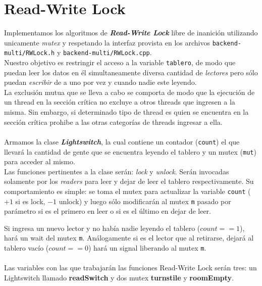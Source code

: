 \section{Read-Write Lock}

Implementamos los algoritmos de \emph{\textbf{Read-Write Lock}} libre de inanici\'on utilizando unicamente \textit{mutex} y respetando la interfaz provista en los archivos \texttt{backend-multi/RWLock.h} y \texttt{backend-multi/RWLock.cpp}.\\

Nuestro objetivo es restringir el acceso a la variable \texttt{tablero}, de modo que puedan leer los datos en \'el simultaneamente diversa cantidad de \emph{lectores} pero s\'olo puedan \emph{escribir} de a uno por vez y cuando nadie este leyendo.\\

La exclusi\'on mutua que se lleva a cabo se comporta de modo que la ejecuci\'on de un thread en la secci\'on cr\'itica no excluye a otros threads que ingresen a la misma. Sin embargo, si determinado tipo de thread es quien se encuentra en la secci\'on cr\'itica prohibe a las otras categor\'ias de threads ingresar a ella.\\
\\

Armamos la clase \emph{\textbf{Lightswitch}}, la cual contiene un contador (\texttt{count}) el que llevar\'a la cantidad de gente que se encuentra leyendo el tablero y un mutex (\texttt{mut}) para acceder al mismo.\\

Las funciones pertinentes a la clase ser\'an: \textit{lock} y \textit{unlock}. Ser\'an invocadas solamente por los \textit{readers} para leer y dejar de leer el tablero respectivamente. Su comportamiento es simple: se toma el mutex para actualizar la variable \texttt{count} ($+1$ si es lock, $-1$ unlock) y luego s\'olo modificar\'an al mutex \texttt{m} pasado por par\'ametro si es el primero en leer o si es el \'ultimo en dejar de leer.

Si ingresa un nuevo lector y no hab\'ia nadie leyendo el tablero ($count == 1$), har\'a un wait del mutex \texttt{m}. An\'alogamente si es el lector que al retirarse, dejar\'a al tablero vac\'io ($count == 0$) har\'a un signal liberando al mutex \texttt{m}.\\
\\

Las variables con las que trabajar\'an las funciones Read-Write Lock ser\'an tres: un Lightswitch llamado \textbf{readSwitch} y dos mutex \textbf{turnstile} y \textbf{roomEmpty}.\\

